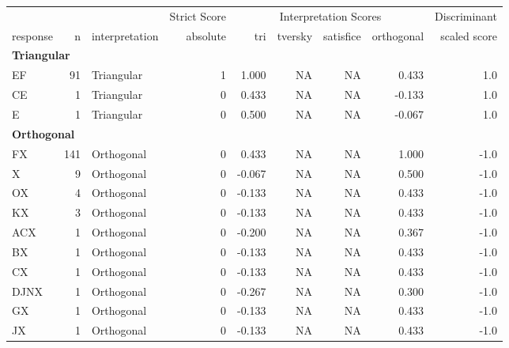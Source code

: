 \documentclass[
  letterpaper,
  DIV=11,
  numbers=noendperiod]{scrreprt}
\begin{document}
\begin{tabular}[t]{l|r|l|r|r|r|r|r|r}
\hline
\multicolumn{3}{c|}{ } & \multicolumn{1}{c|}{Strict Score} & \multicolumn{4}{c|}{Interpretation Scores} & \multicolumn{1}{c}{Discriminant} \\
\cline{4-4} \cline{5-8} \cline{9-9}
response & n & interpretation & absolute & tri & tversky & satisfice & orthogonal & scaled score\\
\hline
\multicolumn{9}{l}{\textbf{Triangular}}\\
\hline
\hspace{1em}EF & 91 & Triangular & 1 & 1.000 & NA & NA & 0.433 & 1.0\\
\hline
\hspace{1em}CE & 1 & Triangular & 0 & 0.433 & NA & NA & -0.133 & 1.0\\
\hline
\hspace{1em}E & 1 & Triangular & 0 & 0.500 & NA & NA & -0.067 & 1.0\\
\hline
\multicolumn{9}{l}{\textbf{Orthogonal}}\\
\hline
\hspace{1em}FX & 141 & Orthogonal & 0 & 0.433 & NA & NA & 1.000 & -1.0\\
\hline
\hspace{1em}X & 9 & Orthogonal & 0 & -0.067 & NA & NA & 0.500 & -1.0\\
\hline
\hspace{1em}OX & 4 & Orthogonal & 0 & -0.133 & NA & NA & 0.433 & -1.0\\
\hline
\hspace{1em}KX & 3 & Orthogonal & 0 & -0.133 & NA & NA & 0.433 & -1.0\\
\hline
\hspace{1em}ACX & 1 & Orthogonal & 0 & -0.200 & NA & NA & 0.367 & -1.0\\
\hline
\hspace{1em}BX & 1 & Orthogonal & 0 & -0.133 & NA & NA & 0.433 & -1.0\\
\hline
\hspace{1em}CX & 1 & Orthogonal & 0 & -0.133 & NA & NA & 0.433 & -1.0\\
\hline
\hspace{1em}DJNX & 1 & Orthogonal & 0 & -0.267 & NA & NA & 0.300 & -1.0\\
\hline
\hspace{1em}GX & 1 & Orthogonal & 0 & -0.133 & NA & NA & 0.433 & -1.0\\
\hline
\hspace{1em}JX & 1 & Orthogonal & 0 & -0.133 & NA & NA & 0.433 & -1.0\\

\end{tabular}
\end{document}

